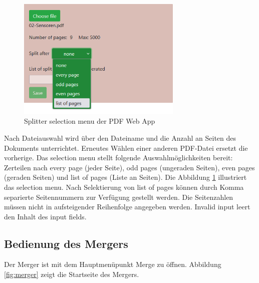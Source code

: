 \begin{figure}[!htbp]
	\centering
	\includegraphics[width=0.7\textwidth]{"images/splitter2.png"}
	\caption{Splitter selection menu der PDF Web App}
	\label{fig:splitter2}
\end{figure}

Nach Dateiauswahl wird über den Dateiname und die Anzahl an Seiten des Dokuments unterrichtet. Erneutes Wählen einer anderen PDF-Datei ersetzt die vorherige. Das selection menu stellt folgende Auswahlmöglichkeiten bereit: Zerteilen nach every page (jeder Seite), odd pages (ungeraden Seiten), even pages (geraden Seiten) und list of pages (Liste an Seiten). Die Abbildung \ref{fig:splitter2} illustriert das selection menu. Nach Selektierung von list of pages können durch Komma separierte Seitennummern zur Verfügung gestellt werden. Die Seitenzahlen müssen nicht in aufsteigender Reihenfolge angegeben werden. Invalid input leert den Inhalt des input fields. 

\subsection{Bedienung des Mergers}
Der Merger ist mit dem Hauptmenüpunkt Merge zu öffnen. Abbildung \ref{fig:merger} zeigt die Startseite des Mergers. 

